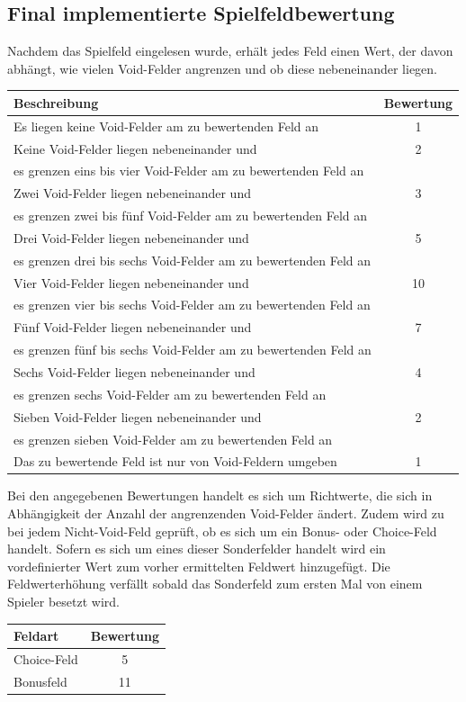 \documentclass[12pt,a4paper]{article}
\begin{document}
\subsection{Final implementierte Spielfeldbewertung}
Nachdem das Spielfeld eingelesen wurde, erhält jedes Feld einen Wert, der davon abhängt, wie vielen Void-Felder angrenzen und ob diese nebeneinander liegen.\newline
\begin{tabular}{|l|c|}
	\hline
	Beschreibung & Bewertung\\
	\hline
	Es liegen keine Void-Felder am zu bewertenden Feld an & 1\\
	\hline
	Keine Void-Felder liegen nebeneinander und & 2\\
	es grenzen eins bis vier Void-Felder am zu bewertenden Feld an &\\
	\hline
	Zwei Void-Felder liegen nebeneinander und & 3\\
	es grenzen zwei bis fünf Void-Felder am zu bewertenden Feld an &\\
	\hline
	Drei Void-Felder liegen nebeneinander und & 5\\
	es grenzen drei bis sechs Void-Felder am zu bewertenden Feld an &\\
	\hline
	Vier Void-Felder liegen nebeneinander und & 10\\
	es grenzen vier bis sechs Void-Felder am zu bewertenden Feld an &\\
	\hline
	Fünf Void-Felder liegen nebeneinander und & 7\\
	es grenzen fünf bis sechs Void-Felder am zu bewertenden Feld an &\\
	\hline
	Sechs Void-Felder liegen nebeneinander und & 4\\
	es grenzen sechs Void-Felder am zu bewertenden Feld an &\\
	\hline
	Sieben Void-Felder liegen nebeneinander und & 2\\
	es grenzen sieben Void-Felder am zu bewertenden Feld an &\\
	\hline
	Das zu bewertende Feld ist nur von Void-Feldern umgeben & 1\\
	\hline
\end{tabular}

Bei den angegebenen Bewertungen handelt es sich um Richtwerte, die sich in Abhängigkeit der Anzahl der angrenzenden Void-Felder ändert.\newline
Zudem wird zu bei jedem Nicht-Void-Feld geprüft, ob es sich um ein Bonus- oder Choice-Feld handelt. Sofern es sich um eines dieser Sonderfelder handelt wird ein vordefinierter Wert zum vorher ermittelten Feldwert hinzugefügt. Die Feldwerterhöhung verfällt sobald das Sonderfeld zum ersten Mal von einem Spieler besetzt wird.\newline
\begin{tabular}{|l|c|}
	\hline
	Feldart & Bewertung\\
	\hline
	Choice-Feld & 5\\
	\hline
	Bonusfeld & 11\\
	\hline
\end{tabular}
\end{document}
